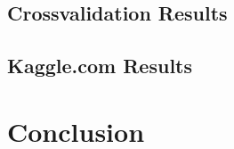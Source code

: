 \documentclass[letterpaper, 11pt]{article}
\begin{document}
\subsection{Crossvalidation Results}


\subsection{Kaggle.com Results}

\section{Conclusion}



\nocite{*}
 

\end{document}
